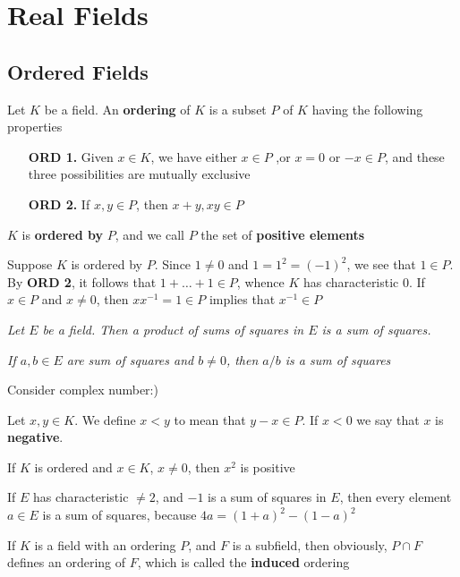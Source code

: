 \documentclass[11pt]{article}
\begin{document}
\section{Real Fields}
\label{sec:org1070042}
\subsection{Ordered Fields}
\label{sec:org2efc2ac}
Let \(K\) be a field. An \textbf{ordering} of \(K\) is a subset \(P\) of \(K\)
having the following properties
\bigskip
\begin{itemize}[itemindent=3em]
\item[\textbf{ORD 1.}] Given \(x\in K\), we have either \(x\in P\) ,or \(x=0\) or
\(-x\in P\), and these three possibilities are mutually exclusive
\item[\textbf{ORD 2.}] If \(x,y\in P\), then \(x+y,xy\in P\)
\end{itemize}

\(K\) is \textbf{ordered by} \(P\), and we call \(P\) the set of \textbf{positive
elements}

Suppose \(K\) is ordered by \(P\). Since \(1\neq0\) and \(1=1^2=(-1)^2\), we
see that \(1\in P\). By \textbf{ORD 2}, it follows that \(1+\dots+1\in P\), whence \(K\)
has characteristic 0. If \(x\in P\) and \(x\neq0\), then \(xx^{-1}=1\in P\) implies
that \(x^{-1}\in P\)

\begin{center}
\emph{Let \(E\) be a field. Then a product of sums of squares in \(E\) is a sum
of squares.}

\emph{If \(a,b\in E\) are sum of squares and \(b\neq0\), then \(a/b\) is a sum of
squares}
\end{center}

Consider complex number:)

Let \(x,y\in K\). We define \(x<y\) to mean that \(y-x\in P\). If \(x<0\) we say
that \(x\) is \textbf{negative}.

If \(K\) is ordered and \(x\in K\), \(x\neq0\), then \(x^2\) is positive

If \(E\) has characteristic \(\neq2\), and \(-1\) is a sum of squares in \(E\),
then every element \(a\in E\) is a sum of squares, because
\(4a=(1+a)^2-(1-a)^2\)

If \(K\) is a field with an ordering \(P\), and \(F\) is a subfield, then
obviously, \(P\cap F\) defines an ordering of \(F\), which is called the
\textbf{induced} ordering
\end{document}
